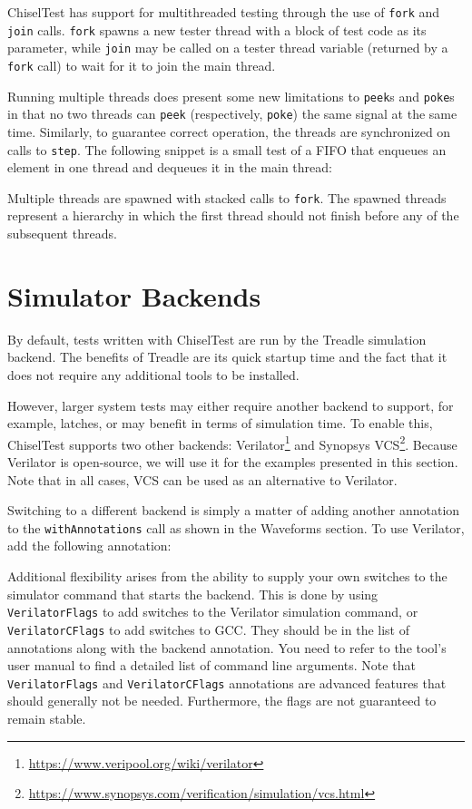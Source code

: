 \documentclass[%
    10pt,
    headinclude, footexclude,
    openright, %
    notitlepage,
    cleardoubleempty,
    headsepline,
    pointlessnumbers,
    bibtotoc, idxtotoc,
    ]{scrbook}
\newcommand{\code}[1]{{\small{\texttt{#1}}}}
\newcommand{\myref}[2]{\href{#1}{#2}}
\renewcommand{\myref}[2]{{#2}{\footnote{\url{#1}}}}
\begin{document}
ChiselTest has support for multithreaded testing through the use of \code{fork} and
\code{join} calls. \code{fork} spawns a new tester thread with a block of test code
as its parameter, while \code{join} may be called on a tester thread variable
(returned by a \code{fork} call) to wait for it to join the main thread.

Running multiple threads does present some new limitations to \code{peek}s and
\code{poke}s in that no two threads can \code{peek} (respectively, \code{poke}) the
same signal at the same time. Similarly, to guarantee correct operation, the threads
are synchronized on calls to \code{step}.
The following snippet is a small test of a FIFO that enqueues an element in one thread
and dequeues it in the main thread:


Multiple threads are spawned with stacked calls to \code{fork}. The spawned threads
represent a hierarchy in which the first thread should not finish before any of the
subsequent threads.

\section{Simulator Backends}

By default, tests written with ChiselTest are run by the Treadle simulation backend.
The benefits of Treadle are its quick startup time and the fact that it does not require any additional tools to be installed.

However,
larger system tests may either require another backend to support, for example, latches, or may
benefit in terms of simulation time. To enable this, ChiselTest supports two other backends:
\myref{https://www.veripool.org/wiki/verilator}{Verilator} and
\myref{https://www.synopsys.com/verification/simulation/vcs.html}{Synopsys VCS}. Because
Verilator is open-source, we will use it for the examples presented in this section. Note
that in all cases, VCS can be used as an alternative to Verilator.

Switching to a different backend is simply a matter of adding another annotation to the
\code{withAnnotations} call as shown in the Waveforms section. To use Verilator, add the following
annotation:


Additional flexibility arises from the ability to supply your own switches to the
simulator command that starts the backend. This is done by using \code{VerilatorFlags}
to add switches to the Verilator simulation command, or \code{VerilatorCFlags} to add
switches to GCC. They should be in the list of annotations along with the backend
annotation. You need to refer to the tool's user manual  to find a detailed list of command line arguments.
Note that \code{VerilatorFlags} and \code{VerilatorCFlags} annotations are advanced features
that should generally not be needed. Furthermore, the flags are not guaranteed to remain stable.
\end{document}
